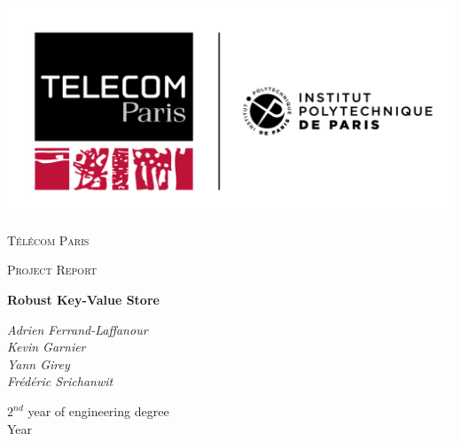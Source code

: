 \documentclass[12pt,a4paper]{report}
\begin{document}
\begin{titlepage}
	\centering
	\includegraphics[width=1\textwidth]{logo_telecom.png}\par
	{\textsc{Télécom Paris} \par}
	\vfill
	\vfill
	{\Large \textsc{Project Report}\par}
	\vspace{1.5cm}
	{\huge\bfseries Robust Key-Value Store\\}
	\vspace{4cm}
	\begin{large}
		{\Large\itshape Adrien Ferrand-Laffanour\\}
		{\Large\itshape Kevin Garnier\\}
		{\Large\itshape Yann Girey\\}
		{\Large\itshape Frédéric Srichanwit\\}
	\end{large}

	\vfill

	\vfill

	{\large $2^{nd}$ year of engineering degree\\Year \the\year \par}
\end{titlepage}
\end{document}
